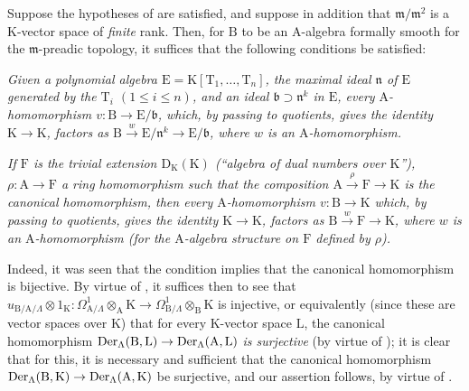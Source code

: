 \begin{remark}[22.1.3]
\label{0.22.1.3}
Suppose the hypotheses of  are satisfied, and suppose in addition that $\mathfrak{m}/\mathfrak{m}^2$ is a $\mathrm{K}$-vector space of \emph{finite} rank.
Then, for $\mathrm{B}$ to be an $\mathrm{A}$-algebra formally smooth for the $\mathfrak{m}$-preadic topology, it suffices that the following conditions be satisfied:

\begin{env}[22.1.3.1]
\label{0.22.1.3.1}
\itshape Given a polynomial algebra $\mathrm{E}=\mathrm{K}[\mathrm{T}_1,\ldots,\mathrm{T}_n]$, the maximal ideal $\mathfrak{n}$ of $\mathrm{E}$ generated by the $\mathrm{T}_i$ $(1\leq i\leq n)$, and an ideal $\mathfrak{b}\supset\mathfrak{n}^k$ in $\mathrm{E}$, every $\mathrm{A}$-homomorphism $v:\mathrm{B}\to\mathrm{E}/\mathfrak b$, which, by passing to quotients, gives the identity $\mathrm{K}\to\mathrm{K}$, factors as $\mathrm{B}\xrightarrow{w}\mathrm{E}/\mathfrak{n}^k\to\mathrm{E}/\mathfrak{b}$, where $w$ is an $\mathrm{A}$-homomorphism.
\end{env}

\begin{env}[22.1.3.2]
\label{0.22.1.3.2}
\itshape If $\mathrm{F}$ is the trivial extension $\mathrm{D}_\mathrm{K}(\mathrm{K})$ \textup{(``algebra of dual numbers over $\mathrm{K}$'')}, $\rho:\mathrm{A}\to\mathrm{F}$ a ring homomorphism such that the composition $\mathrm{A}\xrightarrow{\rho}\mathrm{F}\to\mathrm{K}$ is the canonical homomorphism, then every $\mathrm{A}$-homomorphism $v:\mathrm{B}\to\mathrm{K}$ which, by passing to quotients, gives the identity $\mathrm{K}\to\mathrm{K}$, factors as $\mathrm{B}\xrightarrow{w}\mathrm{F}\to\mathrm{K}$, where $w$ is an $\mathrm{A}$-homomorphism (for the $\mathrm{A}$-algebra structure on $\mathrm{F}$ defined by $\rho$).
\end{env}

Indeed, it was seen  that the condition  implies that the canonical homomorphism  is bijective.
By virtue of , it suffices then to see that $u_{\mathrm{B}/\mathrm{A}/\Lambda}\otimes 1_\mathrm{K}:\Omega^1_{\mathrm{A}/\Lambda}\otimes_\mathrm{A}\mathrm{K}\to\Omega^1_{\mathrm{B}/\Lambda}\otimes_\mathrm{B}\mathrm{K}$ is injective, or equivalently (since these are vector spaces over $\mathrm{K}$) that for every $\mathrm{K}$-vector space $\mathrm{L}$, the canonical homomorphism $\operatorname{Der}_\Lambda(\mathrm{B},\mathrm{L})\to\operatorname{Der}_\Lambda(\mathrm{A},\mathrm{L})$ \emph{is surjective} (by virtue of ); it is clear that for this, it is necessary and sufficient that the canonical homomorphism $\operatorname{Der}_\Lambda(\mathrm{B},\mathrm{K})\to\operatorname{Der}_\Lambda(\mathrm{A},\mathrm{K})$ be surjective, and our assertion follows, by virtue of .


\end{remark}
